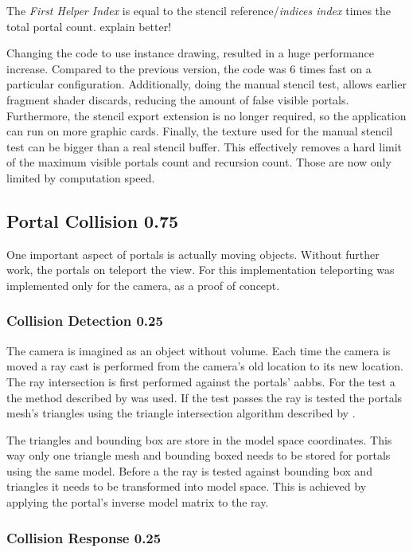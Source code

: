 The \textit{First Helper Index} is equal to the stencil reference/\textit{indices index} times the total portal count. {\huge explain better!} %

Changing the code to use instance drawing, resulted in a huge performance increase. Compared to the previous version, the code was 6 times fast on a particular configuration. Additionally, doing the manual stencil test, allows earlier fragment shader discards, reducing the amount of false visible portals. Furthermore, the stencil export extension is no longer required, so the application can run on more graphic cards. Finally, the texture used for the manual stencil test can be bigger than a real stencil buffer. This effectively removes a hard limit of the maximum visible portals count and recursion count. Those are now only limited by computation speed.


\subsection{Portal Collision 0.75}
One important aspect of portals is actually moving objects. Without further work, the portals on teleport the view. For this implementation teleporting was implemented only for the camera, as a proof of concept.

\subsubsection{Collision Detection 0.25}
The camera is imagined as an object without volume. Each time the camera is moved a ray cast is performed from the camera's old location to its new location. The ray intersection is first performed against the portals' \glspl{aabb}. For the test a the method described by \textcite{williams:2005:efficient} was used. If the test passes the ray is tested the portals mesh's triangles using the triangle intersection algorithm described by \textcite{moller:2005:fast}.


The triangles and bounding box are store in the model space coordinates. This way only one triangle mesh and bounding boxed needs to be stored for portals using the same model. Before a the ray is tested against bounding box and triangles it needs to be transformed into model space. This is achieved by applying the portal's inverse model matrix to the ray.

\subsubsection{Collision Response 0.25}

